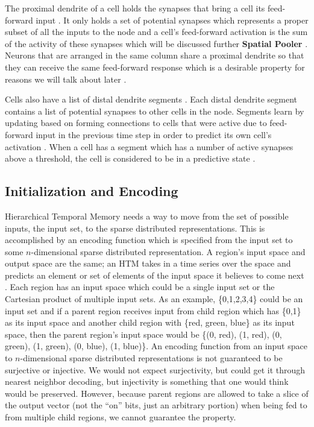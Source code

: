 \documentclass[fleqn,minimal]{article}
\begin{document}
	The proximal dendrite of a cell holds the synapses that bring a cell its feed-forward input \cite{Principles}. It only holds a set of potential synapses which represents a proper subset of all the inputs to the node and a cell's feed-forward activation is the sum of the activity of these synapses which will be discussed further \textbf{Spatial Pooler} \cite{Whitepaper}. Neurons that are arranged in the same column share a proximal dendrite so that they can receive the same feed-forward response which is a desirable property for reasons we will talk about later \cite{Whitepaper}.
	
	Cells also have a list of distal dendrite segments \cite{Whitepaper}. Each distal dendrite segment contains a list of potential synapses to other cells in the node. Segments learn by updating based on forming connections to cells that were active due to feed-forward input in the previous time step in order to predict its own cell's activation \cite{Whitepaper}. When a cell has a segment which has a number of active synapses above a threshold, the cell is considered to be in a predictive state \cite{Principles}.
	
	\subsection{Initialization and Encoding}
	
	Hierarchical Temporal Memory needs a way to move from the set of possible inputs, the input set, to the sparse distributed representations. This is accomplished by an encoding function which is specified from the input set to some $n$-dimensional sparse distributed representation. A region's input space and output space are the same; an HTM takes in a time series over the space and predicts an element or set of elements of the input space it believes to come next \cite{Purdy}. Each region has an input space which could be a single input set or the Cartesian product of multiple input sets. As an example, \{0,1,2,3,4\} could be an input set and if a parent region receives input from child region which has \{0,1\} as its input space and another child region with \{red, green, blue\} as its input space, then the parent region's input space would be \{(0, red), (1, red), (0, green), (1, green), (0, blue), (1, blue)\}. An encoding function from an input space to $n$-dimensional sparse distributed representations is not guaranteed to be surjective or injective. We would not expect surjectivity, but could get it through nearest neighbor decoding, but injectivity is something that one would think would be preserved. However, because parent regions are allowed to take a slice of the output vector (not the ``on'' bits, just an arbitrary portion) when being fed to from multiple child regions, we cannot guarantee the property.
	
\end{document}
